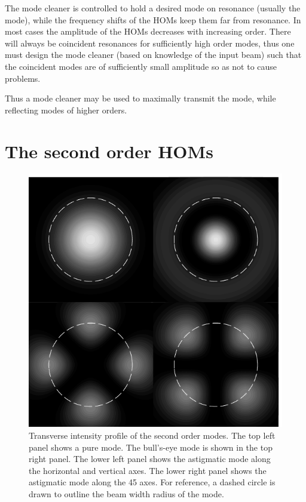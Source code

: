 The mode cleaner is controlled to hold a desired mode on resonance (usually the  mode), while the frequency shifts of the HOMs keep them far from resonance. %
In most cases the amplitude of the HOMs decreases with increasing order. %
There will always be coincident resonances for sufficiently high order modes, thus one must design the mode cleaner (based on knowledge of the input beam) such that the coincident modes are of sufficiently small amplitude so as not to cause problems.

Thus a mode cleaner may be used to maximally transmit the  mode, while reflecting modes of higher orders.

\section{The second order HOMs}
\label{sec:secondordermodes}

\begin{figure}[h!]
  \begin{center}
  \leavevmode
  \includegraphics{figs-ap-notes/puresecondordermodes.pdf}
  \end{center}
  \caption[Transverse intensity profile of the second order modes.]{Transverse intensity profile of the second order modes. The top left panel shows a pure  mode. The bull's-eye mode is shown in the top right panel. The lower left panel shows the astigmatic mode along the horizontal and vertical axes. The lower right panel shows the astigmatic mode along the 45\degrees{} axes. For reference, a dashed circle is drawn to outline the beam width radius of the  mode.}
  \label{fig:puresecondordermodes}
\end{figure}

